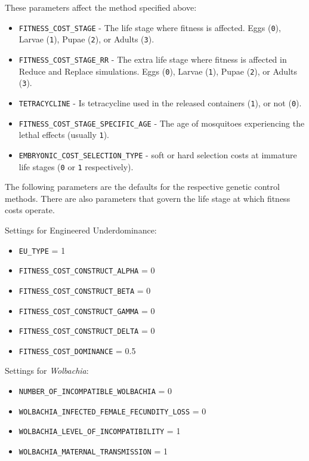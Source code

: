 \documentclass[11pt]{article}
\newcommand{\linecmd}[1]{\texttt{#1}}
\begin{document}
These parameters affect the method specified above:
\begin{itemize}
	\item \linecmd{FITNESS\_COST\_STAGE} - The life stage where fitness is affected. Eggs (\linecmd{0}), Larvae (\linecmd{1}), Pupae (\linecmd{2}), or Adults (\linecmd{3}).
	\item \linecmd{FITNESS\_COST\_STAGE\_RR} - The extra life stage where fitness is affected in Reduce and Replace simulations. Eggs (\linecmd{0}), Larvae (\linecmd{1}), Pupae (\linecmd{2}), or Adults (\linecmd{3}).
	\item \linecmd{TETRACYCLINE} - Is tetracycline used in the released containers  (\linecmd{1}), or not (\linecmd{0}).
	\item \linecmd{FITNESS\_COST\_STAGE\_SPECIFIC\_AGE} - The age of mosquitoes experiencing the lethal effects (usually \linecmd{1}).
	\item \linecmd{EMBRYONIC\_COST\_SELECTION\_TYPE} - soft or hard selection costs at immature life stages (\linecmd{0} or \linecmd{1} respectively).
\end{itemize}

The following parameters are the defaults for the respective genetic control methods. There are also parameters that govern the life stage at which fitness costs operate. %

Settings for Engineered Underdominance:
\begin{itemize}
	\item \linecmd{EU\_TYPE} = 1
	\item \linecmd{FITNESS\_COST\_CONSTRUCT\_ALPHA} = 0
	\item \linecmd{FITNESS\_COST\_CONSTRUCT\_BETA} = 0
	\item \linecmd{FITNESS\_COST\_CONSTRUCT\_GAMMA} = 0
	\item \linecmd{FITNESS\_COST\_CONSTRUCT\_DELTA} = 0
	\item \linecmd{FITNESS\_COST\_DOMINANCE} = 0.5
\end{itemize}

Settings for \emph{Wolbachia}:
\begin{itemize}
	\item \linecmd{NUMBER\_OF\_INCOMPATIBLE\_WOLBACHIA} = 0
	\item \linecmd{WOLBACHIA\_INFECTED\_FEMALE\_FECUNDITY\_LOSS} = 0
	\item \linecmd{WOLBACHIA\_LEVEL\_OF\_INCOMPATIBILITY} = 1
	\item \linecmd{WOLBACHIA\_MATERNAL\_TRANSMISSION} = 1
\end{itemize}
\end{document}
